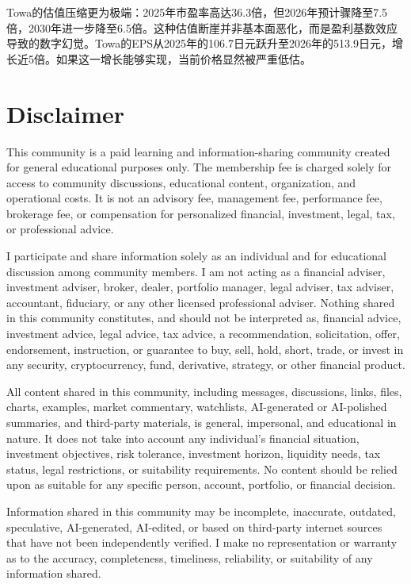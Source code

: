 \documentclass[11pt]{ctexart}
\begin{document}
Towa的估值压缩更为极端：2025年市盈率高达36.3倍，但2026年预计骤降至7.5倍，2030年进一步降至6.5倍。这种估值断崖并非基本面恶化，而是盈利基数效应导致的数字幻觉。Towa的EPS从2025年的106.7日元跃升至2026年的513.9日元，增长近5倍。如果这一增长能够实现，当前价格显然被严重低估。

\section{Disclaimer}
{\scriptsize\color{refgray}
This community is a paid learning and information-sharing community created for general educational purposes only. The membership fee is charged solely for access to community discussions, educational content, organization, and operational costs. It is not an advisory fee, management fee, performance fee, brokerage fee, or compensation for personalized financial, investment, legal, tax, or professional advice.\par
I participate and share information solely as an individual and for educational discussion among community members. I am not acting as a financial adviser, investment adviser, broker, dealer, portfolio manager, legal adviser, tax adviser, accountant, fiduciary, or any other licensed professional adviser. Nothing shared in this community constitutes, and should not be interpreted as, financial advice, investment advice, legal advice, tax advice, a recommendation, solicitation, offer, endorsement, instruction, or guarantee to buy, sell, hold, short, trade, or invest in any security, cryptocurrency, fund, derivative, strategy, or other financial product.\par
All content shared in this community, including messages, discussions, links, files, charts, examples, market commentary, watchlists, AI-generated or AI-polished summaries, and third-party materials, is general, impersonal, and educational in nature. It does not take into account any individual's financial situation, investment objectives, risk tolerance, investment horizon, liquidity needs, tax status, legal restrictions, or suitability requirements. No content should be relied upon as suitable for any specific person, account, portfolio, or financial decision.\par
Information shared in this community may be incomplete, inaccurate, outdated, speculative, AI-generated, AI-edited, or based on third-party internet sources that have not been independently verified. I make no representation or warranty as to the accuracy, completeness, timeliness, reliability, or suitability of any information shared.\par
}
\end{document}
